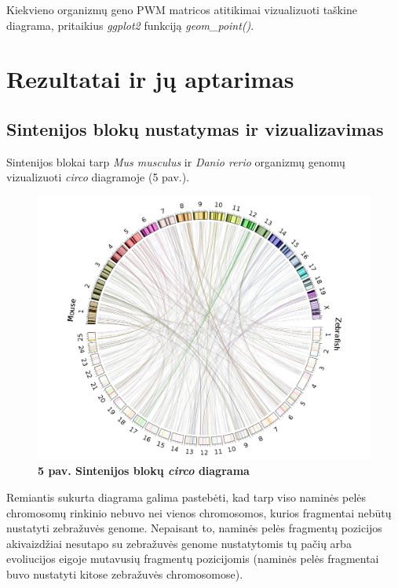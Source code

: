 \documentclass[12pt]{article}
\begin{document}
Kiekvieno organizmų geno PWM matricos atitikimai vizualizuoti taškine diagrama,
pritaikius \emph{ggplot2} funkciją \emph{geom\_point()}.

\newpage


\section{Rezultatai ir jų aptarimas}
\subsection{Sintenijos blokų nustatymas ir vizualizavimas}
Sintenijos blokai tarp \emph{Mus musculus} ir \emph{Danio rerio} organizmų
genomų vizualizuoti \emph{circo} diagramoje (5 pav.).

\begin{figure}[htb]
    \begin{center}
        \includegraphics[width=0.8\linewidth]{../Figures/SynCircos.png}
        \vspace{-1\baselineskip}
        \caption*{\small\textbf{5 pav. Sintenijos blokų \emph{circo}
        diagrama}}
        \label{fig:5}
    \end{center}
\end{figure}

Remiantis sukurta diagrama galima pastebėti, kad tarp viso naminės pelės
chromosomų rinkinio nebuvo nei vienos chromosomos, kurios fragmentai nebūtų
nustatyti zebražuvės genome. Nepaisant to, naminės pelės fragmentų
pozicijos akivaizdžiai nesutapo su zebražuvės genome nustatytomis tų pačių
arba evoliucijos eigoje mutavusių fragmentų pozicijomis (naminės pelės
fragmentai buvo nustatyti kitose zebražuvės chromosomose).
\end{document}
